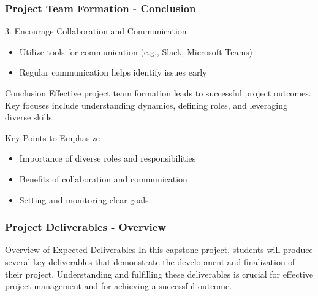 \documentclass[aspectratio=169]{beamer}
\begin{document}
\begin{frame}[fragile]
    \frametitle{Project Team Formation - Conclusion}
    \begin{block}{3. Encourage Collaboration and Communication}
        \begin{itemize}
            \item Utilize tools for communication (e.g., Slack, Microsoft Teams)
            \item Regular communication helps identify issues early
        \end{itemize}
    \end{block}

    \begin{block}{Conclusion}
        Effective project team formation leads to successful project outcomes. 
        Key focuses include understanding dynamics, defining roles, and leveraging diverse skills.
    \end{block}
    
    \begin{block}{Key Points to Emphasize}
        \begin{itemize}
            \item Importance of diverse roles and responsibilities
            \item Benefits of collaboration and communication
            \item Setting and monitoring clear goals
        \end{itemize}
    \end{block}
\end{frame}

\begin{frame}[fragile]
    \frametitle{Project Deliverables - Overview}
    \begin{block}{Overview of Expected Deliverables}
        In this capstone project, students will produce several key deliverables that demonstrate the development and finalization of their project. Understanding and fulfilling these deliverables is crucial for effective project management and for achieving a successful outcome.
    \end{block}
\end{frame}
\end{document}
